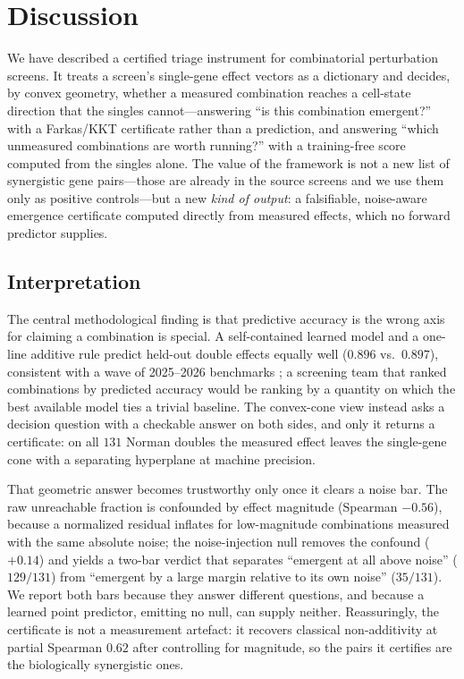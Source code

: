 \section{Discussion}
\label{sec:discussion}

We have described a certified triage instrument for combinatorial perturbation screens. It treats
a screen's single-gene effect vectors as a dictionary and decides, by convex geometry, whether a
measured combination reaches a cell-state direction that the singles cannot---answering ``is this
combination emergent?'' with a Farkas/KKT certificate rather than a prediction, and answering
``which unmeasured combinations are worth running?'' with a training-free score computed from the
singles alone. The value of the framework is not a new list of synergistic gene pairs---those are
already in the source screens and we use them only as positive controls---but a new \emph{kind of
output}: a falsifiable, noise-aware emergence certificate computed directly from measured effects,
which no forward predictor supplies.

\subsection{Interpretation}
The central methodological finding is that predictive accuracy is the wrong axis for claiming a
combination is special. A self-contained learned model and a one-line additive rule predict
held-out double effects equally well ($0.896$ vs.\ $0.897$), consistent with a wave of
2025--2026 benchmarks \citep{AhlmannEltze2025,Wong2025,Kernfeld2025,Atti2025}; a screening team
that ranked combinations by predicted accuracy would be ranking by a quantity on which the best
available model ties a trivial baseline. The convex-cone view instead asks a decision question
with a checkable answer on both sides, and only it returns a certificate: on all $131$ Norman
doubles the measured effect leaves the single-gene cone with a separating hyperplane at machine
precision.

That geometric answer becomes trustworthy only once it clears a noise bar. The raw unreachable
fraction is confounded by effect magnitude (Spearman $-0.56$), because a normalized residual
inflates for low-magnitude combinations measured with the same absolute noise; the
noise-injection null removes the confound ($+0.14$) and yields a two-bar verdict that separates
``emergent at all above noise'' ($129/131$) from ``emergent by a large margin relative to its own
noise'' ($35/131$). We report both bars because they answer different questions, and because a
learned point predictor, emitting no null, can supply neither. Reassuringly, the certificate is
not a measurement artefact: it recovers classical non-additivity at partial Spearman $0.62$ after
controlling for magnitude, so the pairs it certifies are the biologically synergistic ones.

